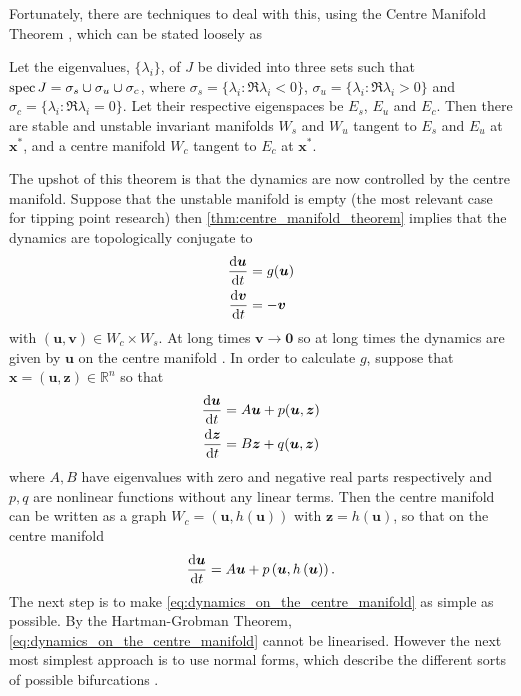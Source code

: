 Fortunately, there are techniques to deal with this, using the Centre Manifold Theorem \parencite{Morris1977}, which can be stated loosely as
\begin{theorem}
  \label{thm:centre_manifold_theorem}
  Let the eigenvalues, $\{\lambda_i\}$, of $J$ be divided into three sets such that $\operatorname{spec} J = \sigma_s \cup \sigma_u \cup \sigma_c$, where $\sigma_s = \{\lambda_i : \Re \lambda_i < 0\}$,
  $\sigma_u = \{\lambda_i : \Re \lambda_i > 0\}$ and $\sigma_c = \{\lambda_i : \Re \lambda_i = 0\}$.
  Let their respective eigenspaces be $E_s$, $E_u$ and $E_c$. Then there are stable and unstable invariant manifolds $W_s$  and $W_u$ tangent to $E_s$ and  $E_u$ at $\bm{x}^{*}$,
  and a centre manifold $W_c$ tangent to $E_c$ at $\bm{x}^*$.
\end{theorem}
The upshot of this theorem is that the dynamics are now controlled by the centre manifold. Suppose that the unstable manifold is empty (the most relevant case for tipping point research)
then \cref{thm:centre_manifold_theorem} implies that the dynamics are topologically conjugate to
\begin{subequations}
  \label{eq:centre_manifold_topological_equivalence}
  \begin{align}
  \dv{\bm{u}}{t} &= g(\bm{u}) \\
  \dv{\bm{v}}{t} &= -\bm{v}
  \end{align}
\end{subequations}
with $(\bm{u},\bm{v}) \in W_c \times W_s$. At long times $\bm{v} \rightarrow \bm{0}$ so at long times the dynamics are given by $\bm{u}$ on the centre manifold
\parencite{guckenheimer2013}. In order to calculate $g$, suppose that
$\bm{x} = (\bm{u},\bm{z}) \in \mathbb{R}^n$ so that
\begin{subequations}
  \label{eq:block_diagonal}
  \begin{align}
    \dv{\bm{u}}{t} &= A\bm{u} + p(\bm{u},\bm{z}) \\
    \dv{\bm{z}}{t} &= B\bm{z} + q(\bm{u},\bm{z})
  \end{align}
\end{subequations}
where $A,B$ have eigenvalues with zero and negative real parts respectively and $p,q$ are nonlinear functions without any linear terms.
Then the centre manifold can be written as a graph $W_c = (\bm{u},h(\bm{u}))$
with $\bm{z} = h(\bm{u})$, so that on the centre manifold
\begin{equation}
  \label{eq:dynamics_on_the_centre_manifold}
  \dv{\bm{u}}{t} = A\bm{u} + p\left(\bm{u},h\left(\bm{u}\right)\right).
\end{equation}
The next step is to make \cref{eq:dynamics_on_the_centre_manifold} as simple as possible. By the Hartman-Grobman Theorem, \cref{eq:dynamics_on_the_centre_manifold}
cannot be linearised. However the next most simplest approach is to use normal forms, which describe the different sorts of possible bifurcations \parencite{Dijkstra2011}.

